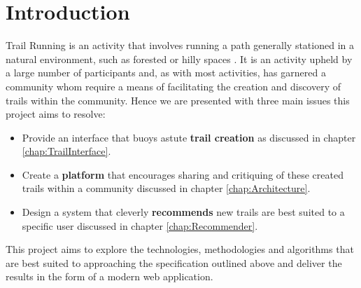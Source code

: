 \chapter{Introduction} \label{chap:Intro}
Trail Running is an activity that involves running a path generally stationed in a natural environment, such as forested or hilly spaces \cite{wiki:TrailRunning}. It is an activity upheld by a large number of participants and, as with most activities, has garnered a community whom require a means of facilitating the creation and discovery of trails within the community. Hence we are presented with three main issues this project aims to resolve:

\begin{itemize}
    \item Provide an interface that buoys astute \textbf{trail creation} as discussed in chapter \ref{chap:TrailInterface}.
    \item Create a \textbf{platform} that encourages sharing and critiquing of these created trails within a community discussed in chapter \ref{chap:Architecture}.
    \item Design a system that cleverly \textbf{recommends} new trails are best suited to a specific user discussed in chapter \ref{chap:Recommender}.
\end{itemize}

This project aims to explore the technologies, methodologies and algorithms that are best suited to approaching the specification outlined above and deliver the results in the form of a modern web application.


